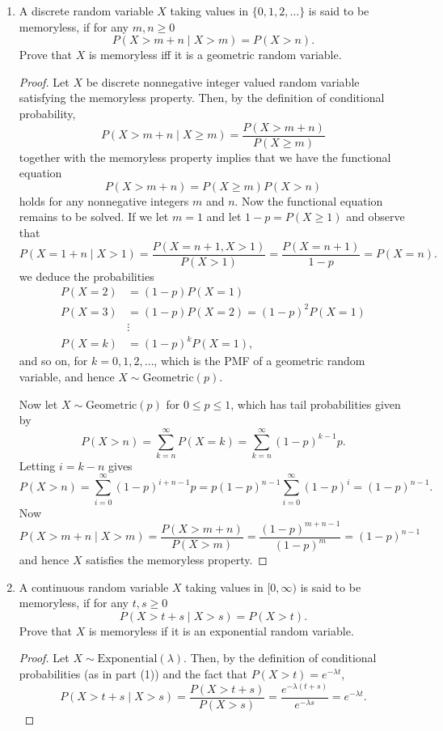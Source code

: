 \documentclass[oneside,reqno]{amsart}
\newcommand{\Exp}{\mathrm{Exponential}}
\newcommand{\Geom}{\mathrm{Geometric}}
\theoremstyle{definition}
\begin{document}
\begin{enumerate}
\item
A discrete random variable $X$ taking values in $\{0, 1, 2, \dotsc \}$ is said to be memoryless, if for any $m, n \geq 0$
\[	
	P(X > m + n \mid X > m) = P(X > n).
\]
Prove that $X$ is memoryless iff it is a geometric random variable.
\begin{proof}
Let $X$ be discrete nonnegative integer valued random variable satisfying the memoryless property. Then, by the definition of conditional probability,
\[
	P(X > m + n \mid X \geq m) = \frac{P(X>m + n)}{P(X \geq m)}
\]
together with the memoryless property implies that we have the functional equation
\[
	P(X > m + n) = P(X \geq m)P(X > n)
\] 
holds for any nonnegative integers $m$ and $n$. Now the functional equation remains to be solved. If we let $m=1$ and let $1-p = P(X \geq 1)$ and observe that 
\[
	P(X = 1+n \mid X > 1) =  \frac{P(X  =  n + 1, X > 1)}{P(X > 1)}  = \frac{P(X =n+1)}{1-p}  = P(X = n).
\]
we deduce the probabilities 
\begin{align*}
	P(X=2) &= (1-p) P(X=1) \\
	P(X=3) &= (1-p)P(X=2) = (1-p)^2 P(X=1) \\
	& \vdots \\ 
	P(X=k) &= (1-p)^k P(X=1),
\end{align*}	
and so on, for $k=0,1,2,\dotsc$, which is the PMF of a geometric random variable, and hence $X \sim \Geom(p)$. 
\par
Now let $X \sim \Geom(p)$ for $0 \leq p \leq 1$, which has tail probabilities given by
\[
	P(X > n) = \sum_{k=n}^\infty P(X = k) = \sum_{k=n}^\infty (1 - p)^{k-1} p.
\]
Letting $i=k-n$ gives
\[
	P(X > n) = \sum_{i=0}^\infty (1 - p)^{i+n-1} p = p(1-p)^{n-1} \sum_{i=0}^\infty (1 - p)^i = (1-p)^{n-1}.
\]
Now 
\[
	P(X > m + n \mid X > m)= \frac{P(X>m + n)}{P(X > m)} = \frac{(1-p)^{m+n-1}}{(1-p)^{m}} = (1-p)^{n-1}
\]
and hence $X$ satisfies the memoryless property. 
\end{proof}

\item
A continuous random variable $X$ taking values in $[0, \infty)$ is said to be memoryless, if for any $t,s\geq 0$ 
\[
	P(X > t + s \mid X > s) = P(X > t).
\]
Prove that $X$ is memoryless if it is an exponential random variable. 
\begin{proof}
Let $X \sim \Exp(\lambda)$. Then, by the definition of conditional probabilities (as in part (1)) and the fact that $P(X>t) = e^{-\lambda t}$, 
\[
	P(X> t+s \mid X > s) =  \frac{P(X > t+s)}{P(X > s)} = \frac{e^{-\lambda(t+s)}}{e^{-\lambda s}} = e^{-\lambda t}.
\]
\end{proof}


\end{enumerate}
\end{document}
